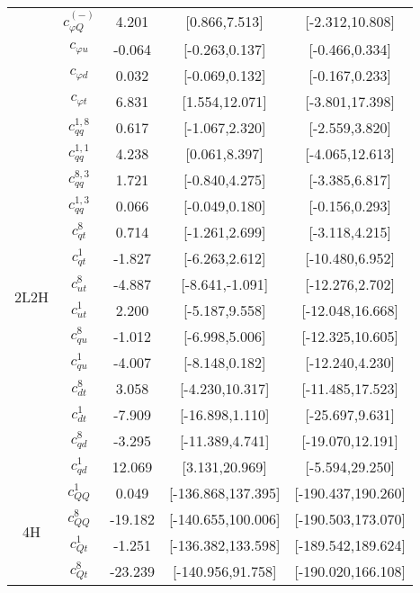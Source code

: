 \documentclass{article}
\begin{document}
\begin{table}[H]
\begin{tabular}{|c|c|c|c|c|}
 & $c_{\varphi Q}^{(-)}$ & 4.201 & [0.866,7.513] & [-2.312,10.808]  \\ \cline{2-5}
 & $c_{\varphi u}$ & -0.064 & [-0.263,0.137] & [-0.466,0.334]  \\ \cline{2-5}
 & $c_{\varphi d}$ & 0.032 & [-0.069,0.132] & [-0.167,0.233]  \\ \cline{2-5}
 & $c_{\varphi t}$ & 6.831 & [1.554,12.071] & [-3.801,17.398]  \\ \cline{2-5}
\hline
\multirow{14}{*}{2L2H}
 & $c_{qq}^{1,8}$ & 0.617 & [-1.067,2.320] & [-2.559,3.820]  \\ \cline{2-5}
 & $c_{qq}^{1,1}$ & 4.238 & [0.061,8.397] & [-4.065,12.613]  \\ \cline{2-5}
 & $c_{qq}^{8,3}$ & 1.721 & [-0.840,4.275] & [-3.385,6.817]  \\ \cline{2-5}
 & $c_{qq}^{1,3}$ & 0.066 & [-0.049,0.180] & [-0.156,0.293]  \\ \cline{2-5}
 & $c_{qt}^{8}$ & 0.714 & [-1.261,2.699] & [-3.118,4.215]  \\ \cline{2-5}
 & $c_{qt}^{1}$ & -1.827 & [-6.263,2.612] & [-10.480,6.952]  \\ \cline{2-5}
 & $c_{ut}^{8}$ & -4.887 & [-8.641,-1.091] & [-12.276,2.702]  \\ \cline{2-5}
 & $c_{ut}^{1}$ & 2.200 & [-5.187,9.558] & [-12.048,16.668]  \\ \cline{2-5}
 & $c_{qu}^{8}$ & -1.012 & [-6.998,5.006] & [-12.325,10.605]  \\ \cline{2-5}
 & $c_{qu}^{1}$ & -4.007 & [-8.148,0.182] & [-12.240,4.230]  \\ \cline{2-5}
 & $c_{dt}^{8}$ & 3.058 & [-4.230,10.317] & [-11.485,17.523]  \\ \cline{2-5}
 & $c_{dt}^{1}$ & -7.909 & [-16.898,1.110] & [-25.697,9.631]  \\ \cline{2-5}
 & $c_{qd}^{8}$ & -3.295 & [-11.389,4.741] & [-19.070,12.191]  \\ \cline{2-5}
 & $c_{qd}^{1}$ & 12.069 & [3.131,20.969] & [-5.594,29.250]  \\ \cline{2-5}
\hline
\multirow{5}{*}{4H}
 & $c_{QQ}^{1}$ & 0.049 & [-136.868,137.395] & [-190.437,190.260]  \\ \cline{2-5}
 & $c_{QQ}^{8}$ & -19.182 & [-140.655,100.006] & [-190.503,173.070]  \\ \cline{2-5}
 & $c_{Qt}^{1}$ & -1.251 & [-136.382,133.598] & [-189.542,189.624]  \\ \cline{2-5}
 & $c_{Qt}^{8}$ & -23.239 & [-140.956,91.758] & [-190.020,166.108]  \\ \cline{2-5}

\end{tabular}
\end{table}
\end{document}
